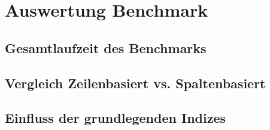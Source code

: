 \chapter{Auswertung Benchmark}

\section{Gesamtlaufzeit des Benchmarks}\label{auswertung:generell}


\section{Vergleich Zeilenbasiert vs. Spaltenbasiert}\label{auswertung:row_vs_col}


\section{Einfluss der grundlegenden Indizes}\label{auswertung:basic_indizes}

